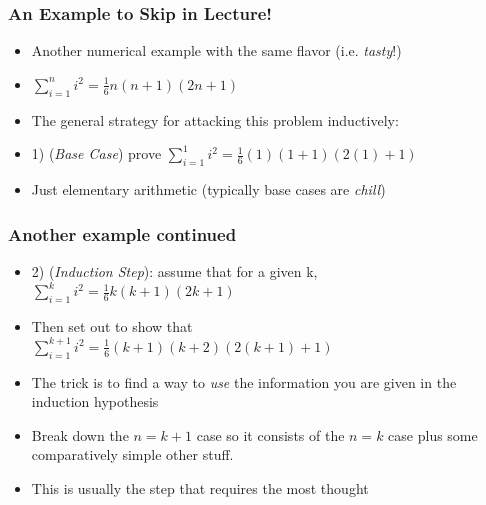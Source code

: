  \begin{frame}
\frametitle{An Example to Skip in Lecture!}

\begin{itemize}
\item Another numerical example with the same flavor (i.e. \textit{tasty}!) 

\item $\displaystyle\sum_{i=1}^n i^2 = \frac{1}{6}n(n+1)(2n+1) $%

\item The general strategy for attacking this problem inductively:

\item[] 1) (\emph{Base Case}) prove $\displaystyle\sum_{i=1}^1 i^2 = \frac{1}{6}(1)(1+1)(2(1)+1) $%

\item Just elementary arithmetic (typically base cases are \textit{chill})

\end{itemize} 
\end{frame}

 \begin{frame}
\frametitle{Another example continued}

\begin{itemize}

\item[] 2)  (\emph{Induction Step}): assume that for a given k, $\displaystyle\sum_{i=1}^k i^2 = \frac{1}{6}k(k+1)(2k+1)$\\[2ex]

\item Then set out to show that\\[2ex]

 $\displaystyle\sum_{i=1}^{k+1} i^2 = \frac{1}{6}(k+1)(k+2)(2(k+1)+1)$\\[2ex]

\item The trick is to find a way to {\it{use}} the information you are given in the induction hypothesis
\bi
\item Break down the $n=k+1$ case so it consists of the $n=k$ case plus some comparatively simple other stuff. 
\item This is usually the step that requires the most thought 
\ei 

\end{itemize} 
\end{frame}



